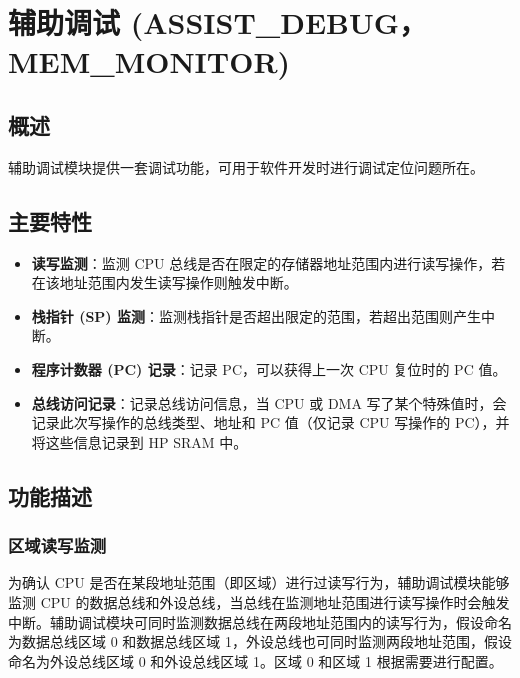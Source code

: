 \documentclass[main\_\_CN.tex]{subfiles}
\begin{document}

\ifglobal
\else
    {\let\clearpage\relax \listoftodos}
    {\let\clearpage\relax \listofdonetodos}
    \tableofcontents
\fi



\chapter{辅助调试 (ASSIST\_DEBUG，MEM\_MONITOR)}
\label{mod:dbgassist}
\hypertarget{dbgassist}{}

\section{概述}

辅助调试模块提供一套调试功能，可用于软件开发时进行调试定位问题所在。

\section{主要特性}
\label{sec:dbgassist-features}

\begin{itemize}
    \item {\bfseries 读写监测}：监测 CPU 总线是否在限定的存储器地址范围内进行读写操作，若在该地址范围内发生读写操作则触发中断。
    \item {\bfseries 栈指针 (SP) 监测}：监测栈指针是否超出限定的范围，若超出范围则产生中断。
    \item {\bfseries 程序计数器 (PC) 记录}：记录 PC，可以获得上一次 CPU 复位时的 PC 值。
    \item {\bfseries 总线访问记录}：记录总线访问信息，当 CPU 或 DMA 写了某个特殊值时，会记录此次写操作的总线类型、地址和 PC 值（仅记录 CPU 写操作的 PC），并将这些信息记录到 HP SRAM 中。
\end{itemize}

\section{功能描述}
\label{sec:dbgassist-func-descr}

\subsection{区域读写监测}
为确认 CPU 是否在某段地址范围（即区域）进行过读写行为，辅助调试模块能够监测 CPU 的数据总线和外设总线，当总线在监测地址范围进行读写操作时会触发中断。辅助调试模块可同时监测数据总线在两段地址范围内的读写行为，假设命名为数据总线区域 0 和数据总线区域 1，外设总线也可同时监测两段地址范围，假设命名为外设总线区域 0 和外设总线区域 1。区域 0 和区域 1 根据需要进行配置。
\end{document}
